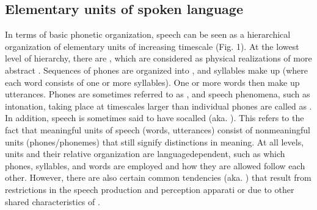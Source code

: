 \documentclass[letterpaper,10pt,english]{jupyterBook}
\begin{document}
\subsection{Elementary units of spoken language}
\label{\detokenize{Introduction/Linguistic_structure_of_speech:elementary-units-of-spoken-language}}
\sphinxAtStartPar
In terms of basic phonetic organization, speech can be seen as a
hierarchical organization of elementary units of increasing time\sphinxhyphen{}scale
(Fig. 1). At the lowest level of hierarchy, there are , which
are considered as physical realizations of more abstract .
Sequences of phones are organized into , and syllables make
up  (where each word consists of one or more syllables). One or
more words then make up utterances. Phones are sometimes referred to as
, and speech phenomena, such as intonation, taking
place at time\sphinxhyphen{}scales larger than individual phones are called as
. In addition, speech is sometimes said to
have so\sphinxhyphen{}called  (aka. ).
This refers to the fact that meaningful units of speech (words,
utterances) consist of non\sphinxhyphen{}meaningful units (phones/phonemes) that still
signify distinctions in meaning. At all levels, units and their relative
organization are language\sphinxhyphen{}dependent, such as which phones, syllables,
and words are employed and how they are allowed follow each other.
However, there are also certain common tendencies (aka. ) that
result from restrictions in the speech production and perception
apparati or due to other shared characteristics of .

\sphinxAtStartPar
{}
 
\end{document}
